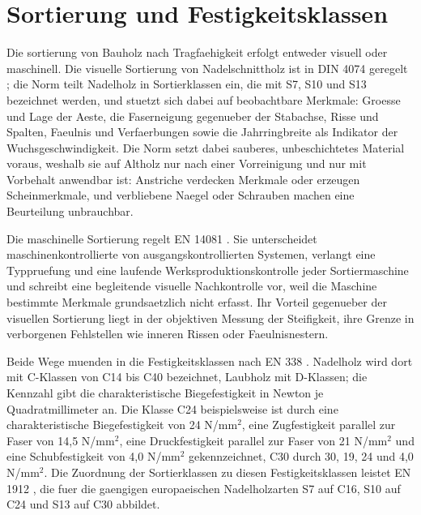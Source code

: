 \section{Sortierung und Festigkeitsklassen}
\label{sec:sortierung}

Die \gls{sortierung} von Bauholz nach Tragfaehigkeit erfolgt entweder visuell
oder maschinell. Die visuelle Sortierung von Nadelschnittholz ist in
DIN 4074 geregelt \parencite{din4074}; die Norm teilt Nadelholz in
Sortierklassen ein, die mit S7, S10 und S13 bezeichnet werden, und stuetzt
sich dabei auf beobachtbare Merkmale: Groesse und Lage der Aeste, die
Faserneigung gegenueber der Stabachse, Risse und Spalten, Faeulnis und
Verfaerbungen sowie die Jahrringbreite als Indikator der
Wuchsgeschwindigkeit. Die Norm setzt dabei sauberes, unbeschichtetes Material
voraus, weshalb sie auf Altholz nur nach einer Vorreinigung und nur mit
Vorbehalt anwendbar ist: Anstriche verdecken Merkmale oder erzeugen
Scheinmerkmale, und verbliebene Naegel oder Schrauben machen eine
Beurteilung unbrauchbar.

Die maschinelle Sortierung regelt EN 14081 \parencite{en14081}. Sie
unterscheidet maschinenkontrollierte von ausgangskontrollierten Systemen,
verlangt eine Typpruefung und eine laufende Werksproduktionskontrolle jeder
Sortiermaschine und schreibt eine begleitende visuelle Nachkontrolle vor, weil
die Maschine bestimmte Merkmale grundsaetzlich nicht erfasst. Ihr Vorteil
gegenueber der visuellen Sortierung liegt in der objektiven Messung der
Steifigkeit, ihre Grenze in verborgenen Fehlstellen wie inneren Rissen oder
Faeulnisnestern.

Beide Wege muenden in die Festigkeitsklassen nach EN 338
\parencite{en338}. Nadelholz wird dort mit C-Klassen von C14 bis C40
bezeichnet, Laubholz mit D-Klassen; die Kennzahl gibt die charakteristische
Biegefestigkeit in Newton je Quadratmillimeter an. Die Klasse C24
beispielsweise ist durch eine charakteristische Biegefestigkeit von
24 N/mm$^2$, eine Zugfestigkeit parallel zur Faser von 14,5 N/mm$^2$, eine
Druckfestigkeit parallel zur Faser von 21 N/mm$^2$ und eine Schubfestigkeit
von 4,0 N/mm$^2$ gekennzeichnet, C30 durch 30, 19, 24 und 4,0 N/mm$^2$. Die
Zuordnung der Sortierklassen zu diesen Festigkeitsklassen leistet EN 1912
\parencite{en1912}, die fuer die gaengigen europaeischen Nadelholzarten S7 auf
C16, S10 auf C24 und S13 auf C30 abbildet.

